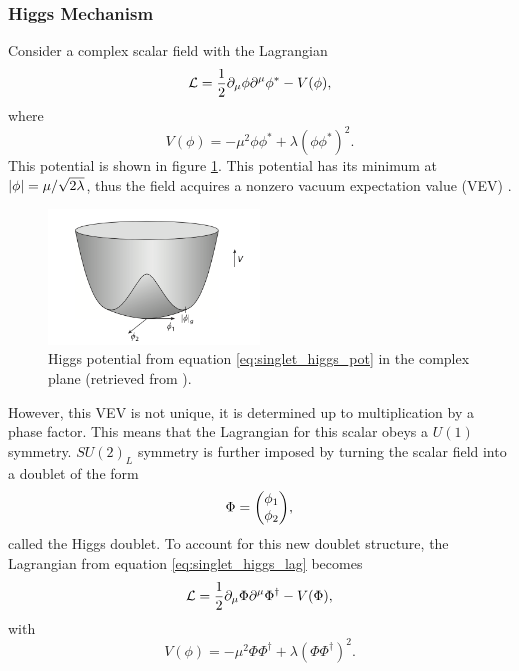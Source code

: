 \subsubsection*{Higgs Mechanism}

Consider a complex scalar field with the Lagrangian
\begin{equation}\label{eq:singlet_higgs_lag}
    \mathcal{L} = \frac{1}{2}\partial_{\mu} \phi \partial^{\mu} \phi^* - V(\phi),
\end{equation}
where
\begin{equation}\label{eq:singlet_higgs_pot}
    V(\phi) = -\mu^2 \phi\phi^* + \lambda(\phi\phi^*)^2.
\end{equation}
This potential is shown in figure \ref{fig:higgs}. This potential has its minimum at $\abs{\phi} = \mu/\sqrt{2\lambda}$, thus the field acquires a nonzero vacuum expectation value (VEV) \cite{goldberg_standard_2017}. 
\begin{figure}[t]
    \centering
    \includegraphics[width = 0.5\textwidth]{images/higgs-potential.png}
    \caption{Higgs potential from equation \eqref{eq:singlet_higgs_pot} in the complex plane (retrieved from \cite{goldberg_standard_2017}).}
    \label{fig:higgs}
\end{figure}

However, this  VEV is not unique, it is determined up to multiplication by a phase factor. This means that the Lagrangian for this scalar obeys a $U(1)$ symmetry. $SU(2)_L$ symmetry is further imposed by turning the scalar field into a doublet of the form $$\Phi = \mqty(\phi_1 \\ \phi_2),$$ called the Higgs doublet. To account for this new doublet structure, the Lagrangian from equation \eqref{eq:singlet_higgs_lag} becomes
\begin{equation}
    \mathcal{L} = \frac{1}{2}\partial_{\mu} \Phi \partial^{\mu} \Phi^\dagger - V(\Phi),
\end{equation}
with
\begin{equation}\label{eq:higgs_pot}
    V(\phi) = -\mu^2 \Phi\Phi^\dagger + \lambda(\Phi\Phi^\dagger)^2.
\end{equation}

